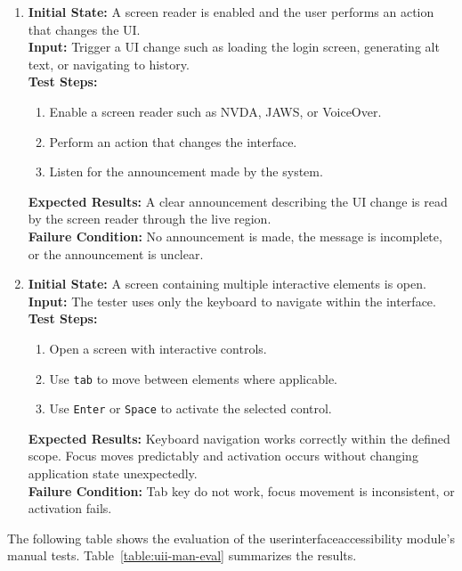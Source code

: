 \documentclass[12pt, titlepage]{article}
\begin{document}
\begin{enumerate}[label=UIA-MT \arabic*., wide=0pt, leftmargin=*]
  \item{}
    {\bf Initial State:} A screen reader is enabled and the user
    performs an action that changes the UI. \\
    {\bf Input:} Trigger a UI change such as loading the login
    screen, generating alt text, or navigating to history. \\
    {\bf Test Steps:}
    \begin{enumerate}
      \item Enable a screen reader such as NVDA, JAWS, or VoiceOver.
      \item Perform an action that changes the interface.
      \item Listen for the announcement made by the system.
    \end{enumerate}
    {\bf Expected Results:} A clear announcement describing the UI
    change is read by the screen reader through the live region. \\
    {\bf Failure Condition:} No announcement is made, the message is
    incomplete, or the announcement is unclear. \\

  \item{}
    {\bf Initial State:} A screen containing multiple interactive
    elements is open. \\
    {\bf Input:} The tester uses only the keyboard to navigate within
    the interface. \\
    {\bf Test Steps:}
    \begin{enumerate}
      \item Open a screen with interactive controls.
      \item Use \texttt{tab} to move between elements where applicable.
      \item Use {\tt Enter} or {\tt Space} to activate the selected control.
    \end{enumerate}
    {\bf Expected Results:} Keyboard navigation works correctly
    within the defined scope. Focus moves predictably and activation
    occurs without changing application state unexpectedly. \\
    {\bf Failure Condition:} Tab key do not work, focus movement is
    inconsistent, or activation fails. \\

\end{enumerate}
The following table shows the evaluation of the userinterfaceaccessibility
module’s manual tests. Table~\ref{table:uii-man-eval} summarizes the results.
\end{document}
